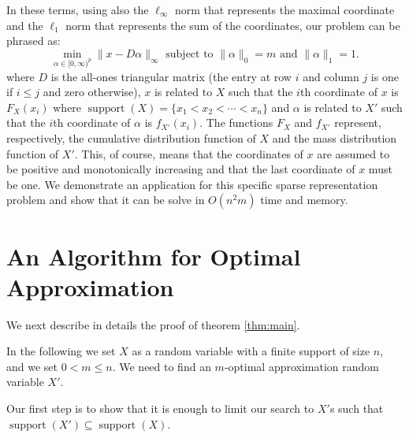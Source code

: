 \documentclass{article}
\DeclareMathOperator{\support}{support}
\begin{document}
In these terms, using also the $\ell_\infty$ norm that represents the maximal coordinate and the $\ell_1$ norm that represents the sum of the coordinates, our problem can be phrased as:
$$
\min_{\alpha \in [0,\infty)^p}\|x - D\alpha\|_{\infty} \text{ subject to }  \|\alpha\|_0 = m \text{ and } \|\alpha\|_1=1.
$$
where $D$ is the all-ones triangular matrix (the entry at row $i$ and column $j$ is one if $i\leq j$ and zero otherwise), $x$ is related to $X$ such that the $i$th coordinate of $x$ is $F_X(x_i)$ where $\support(X)=\{x_1 < x_2 < \cdots < x_n\}$ and $\alpha$ is related to $X'$ such that the $i$th coordinate of $\alpha$ is $f_{X'}(x_i)$. The functions $F_X$ and $f_{X'}$ represent, respectively, the cumulative distribution function of $X$ and the mass distribution function of $X'$. This, of course, means that the coordinates of $x$ are assumed to be positive and monotonically increasing and that the last coordinate of $x$ must be one. We demonstrate an application for this specific sparse representation problem and show that it can be solve in $O(n^2m)$ time and memory.




\section{An Algorithm for Optimal Approximation}\label{sec:alg}



We next describe in details the proof of theorem \ref{thm:main}. 


In the following we set $X$ as a random variable with a finite support of size $n$, and we set $0<m\leq n$. We need to find an $m$-optimal approximation random variable $X'$. 


Our first step is to show that it is enough to limit our search to $X'$s such that $\support(X') \subseteq \support(X)$.
\end{document}
